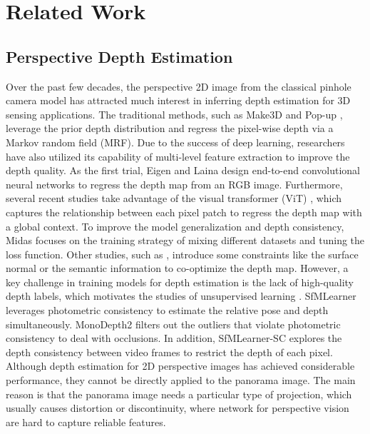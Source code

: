 \section{Related Work}
\label{sec:related}


\subsection{Perspective Depth Estimation}
Over the past few decades, the perspective 2D image from the classical pinhole camera model has attracted much interest in inferring depth estimation for 3D sensing applications. 
The traditional methods, such as Make3D \cite{saxena2008make3d} and Pop-up \cite{hoiem2005automatic}, leverage the prior depth distribution and regress the pixel-wise depth via a Markov random field (MRF). 
Due to the success of deep learning, researchers have also utilized its capability of multi-level feature extraction to improve the depth quality. As the first trial, Eigen \cite{eigen2014depth} and Laina \cite{laina2016deeper} design end-to-end convolutional neural networks to regress the depth map from an RGB image. 
Furthermore, several recent studies \cite{bhat2021adabins,yuan2022new} take advantage of the visual transformer (ViT) \cite{vit2021}, which captures the relationship between each pixel patch to regress the depth map with a global context. 
To improve the model generalization and depth consistency, Midas \cite{ranftl2020towards} focuses on the training strategy of mixing different datasets and tuning the loss function. 
Other studies, such as \cite{eigen2015predicting,alhashim2018high,yin2021virtual,patil2022p3depth}, introduce some constraints like the surface normal or the semantic information to co-optimize the depth map.
However, a key challenge in training models for depth estimation is the lack of high-quality depth labels, which motivates the studies of unsupervised learning \cite{zhou2017unsupervised,godard2019digging,bian2021unsupervised,zhao2020towards,watson2021temporal}. SfMLearner \cite{zhou2017unsupervised} leverages photometric consistency to estimate the relative pose and depth simultaneously. MonoDepth2 \cite{godard2019digging} filters out the outliers that violate photometric consistency to deal with occlusions. In addition, SfMLearner-SC \cite{bian2021unsupervised} explores the depth consistency between video frames to restrict the depth of each pixel.
Although depth estimation for 2D perspective images has achieved considerable performance, they cannot be directly applied to the panorama image. 
The main reason is that the panorama image needs a particular type of projection, which usually causes distortion or discontinuity, where network for perspective vision are hard to capture reliable features.

